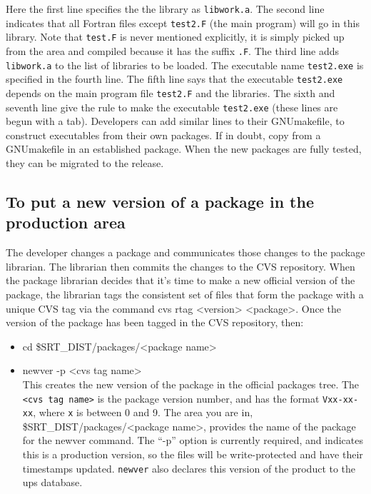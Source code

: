 \documentclass[12pt]{article}
\begin{document}
Here the first line specifies the the library as \texttt{libwork.a}. The 
second
line indicates that all Fortran files except \texttt{test2.F} (the main 
program) will go in
this library. Note that \texttt{test.F} is never mentioned explicitly, it is
simply picked up from the area and compiled because it has the suffix
\texttt{.F}. The third line adds \texttt{libwork.a} to the list of libraries 
to be loaded.
The executable name \texttt{test2.exe} is specified in the fourth line.  The 
fifth line says
that the executable \texttt{test2.exe} depends on the main program file 
\texttt{test2.F} and the 
libraries.  The sixth and seventh line give the rule to make the executable
\texttt{test2.exe} (these lines are begun with a tab).  Developers can add 
similar lines to their GNUmakefile, to 
construct executables from their own packages.  If in doubt, copy from 
a GNUmakefile in an established package. When the new 
packages are fully
tested, they can be migrated to the release.

\subsection{To put a new version of a package in the production area}
\label{sec_newver}

The developer changes a package and communicates those changes to the
package librarian. The librarian then commits the changes to the 
CVS
repository. When the package librarian decides that it's time to make a 
new official version of the package, the librarian tags the consistent set of 
files that form the package with a unique CVS tag via the command 
{\ttfamily cvs rtag <version> <package>}. 
Once the version of the package has been tagged 
in the CVS repository, then:
\begin{itemize}
\item {\ttfamily cd \$SRT\_DIST/packages/<package name>}
\item {\ttfamily newver -p <cvs tag name>}\\
This creates the new version of the package  in the official packages tree.  
The \texttt{<cvs tag name>} is the package version number, and has the format
\texttt{Vxx-xx-xx}, where \texttt{x} is between 0 and 9. The 
area you are in, {\ttfamily \$SRT\_DIST/packages/<package name>}, provides the
name of the package for the {\ttfamily newver} command.  The ``-p'' option 
is currently required, and indicates this is a production version, so the 
files will be write-protected and have their timestamps updated.
\texttt{newver} also declares this version of the product to the ups
database. 
\end{itemize}
\end{document}

